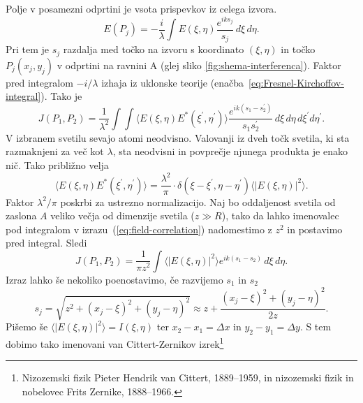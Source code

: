Polje v posamezni odprtini je vsota prispevkov iz celega izvora.
\begin{equation}
E(P_{j})=-\frac{i}{\lambda}\int E(\xi,\eta)\frac{e^{iks_{j}}}{s_{j}}\, d\xi\, d\eta.
\end{equation}
Pri tem je $s_{j}$ razdalja med točko na izvoru s koordinato $(\xi,\eta)$  in točko
$P_{j}(x_{j},y_{j})$ v odprtini na ravnini A (glej sliko \ref{fig:shema-interferenca}).
Faktor pred integralom $-i/\lambda$ izhaja iz uklonske teorije (enačba~\ref{eq:Fresnel-Kirchoffov-integral}).
Tako je 
\begin{equation}
J(P_{1},P_{2})=\frac{1}{\lambda^{2}}\int\int\langle E(\xi,\eta)E^{*}(\xi^{\prime},\eta^{\prime})\rangle\frac{e^{ik(s_{1}-s_{2}^{\prime})}}{s_{1}s_{2}^{\prime}}\, d\xi\, d\eta\, d\xi^{\prime}d\eta^{\prime}.\label{eq:field-correlation}
\end{equation}
V izbranem svetilu sevajo atomi neodvisno. Valovanji iz dveh točk svetila,
ki sta razmaknjeni za več kot $\lambda$, sta neodvisni in povprečje
njunega produkta je enako nič. Tako približno velja 
\begin{equation}
\langle E(\xi,\eta)E^{*}(\xi^{\prime},\eta^{\prime})\rangle=\frac{\lambda^{2}}{\pi} \cdot \delta(\xi-\xi^{\prime},\eta-\eta^{\prime})\langle|E(\xi,\eta)|^{2}\rangle.
\label{eq:delta-Zernike}
\end{equation}
Faktor $\lambda^{2}/\pi$ poskrbi za ustrezno normalizacijo. 
Naj bo oddaljenost svetila od zaslona $A$
veliko večja od dimenzije svetila ($z\gg R$), tako da lahko imenovalec pod integralom
v izrazu~(\ref{eq:field-correlation}) nadomestimo z $z^{2}$ in postavimo
pred integral. Sledi
\begin{equation}
J(P_{1},P_{2})=\frac{1}{\pi z^{2}}\int\langle|E(\xi,\eta)|^{2}\rangle e^{ik(s_{1}-s_{2})}\, d\xi\, d\eta.\label{eq:Zernike1}
\end{equation}
Izraz lahko še nekoliko poenostavimo, če razvijemo $s_{1}$
in $s_{2}$ 
\begin{equation}
s_{j}=\sqrt{z^{2}+(x_{j}-\xi)^{2}+(y_{j}-\eta)^{2}}\approx z+\frac{(x_{j}-\xi)^{2}+(y_{j}-\eta)^{2}}{2z}.
\end{equation}
Pišemo še $\langle|E(\xi,\eta)|^{2}\rangle=I(\xi,\eta)$ ter $x_{2}-x_{1}=\Delta x$
in $y_{2}-y_{1}=\Delta y$. S tem dobimo tako imenovani 
van Cittert-Zernikov izrek\footnote{Nizozemski fizik Pieter Hendrik van Cittert, 1889--1959, in 
nizozemski fizik in nobelovec Frits Zernike, 1888--1966.}

